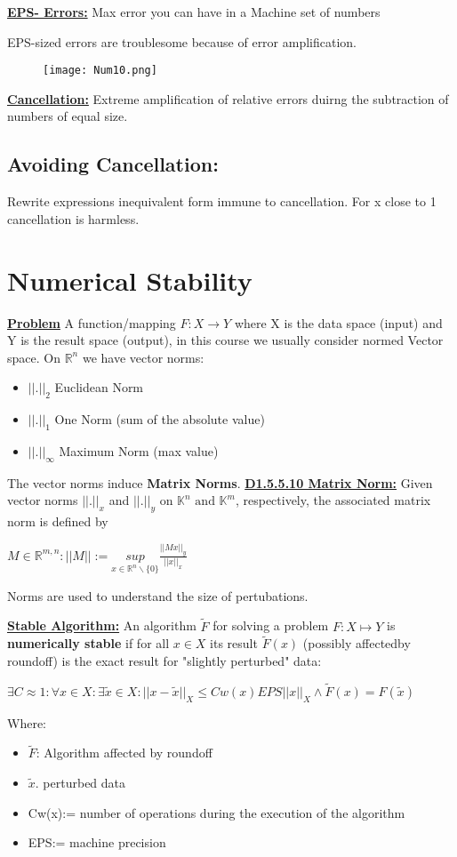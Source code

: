 \documentclass[8pt]{extreport}
\begin{document}
\underline{\textbf{EPS- Errors:}} Max error you  can have in a Machine set of numbers

EPS-sized errors are troublesome because of error amplification.
\begin{figure}[H]
\centering
\texttt{[image: Num10.png]}
\end{figure}

\underline{\textbf{Cancellation:}} Extreme amplification of relative errors duirng the subtraction of numbers of equal size. 

\subsection{Avoiding Cancellation:} Rewrite expressions inequivalent form immune to cancellation.
For x close to 1 cancellation is harmless.
  
\section{Numerical Stability}

\underline{\textbf{Problem}} A function/mapping $F:X \rightarrow Y$ where X is the data space (input) and Y is the result space (output), in this course we usually consider normed Vector space. On $\mathbb{R}^n$ we have vector norms:
\begin{itemize}
\item $||.||_2$ Euclidean Norm
\item $||.||_1$ One Norm (sum of the absolute value)
\item $||.||_\infty$ Maximum Norm (max value)
\end{itemize}
The vector norms induce \textbf{Matrix Norms}.
\underline{\textbf{D1.5.5.10 Matrix Norm:}} Given vector norms $||.||_x$ and $||.||_y$ on $\mathbb{K}^n \text{ and } \mathbb{K}^m$, respectively, the associated matrix norm is defined by 
\begin{center}
$M \in \mathbb{R}^{m,n}: ||M||:= \underset{x \in \mathbb{R}^n\backslash\{0\}}{sup} \frac{||Mx||_y}{||x||_x}$
\end{center}

Norms are used to understand the size of pertubations.

\underline{\textbf{Stable Algorithm:}} An algorithm $\tilde{F}$ for solving a problem $F:X \mapsto Y$ is \textbf{numerically stable} if for all $x \in X$ its result $\tilde{F}(x)$ (possibly affectedby roundoff) is the exact result for "slightly perturbed" data:
\begin{center}
$\exists C \approx 1: \forall x \in X: \exists \tilde{x} \in X: ||x-\tilde{x}||_X \leq Cw(x)EPS||x||_X \wedge \tilde{F}(x) = F(\tilde{x})$
\end{center}
Where:
\begin{itemize}
\item $\tilde{F}$: Algorithm affected by roundoff
\item $\tilde{x}$. perturbed data
\item Cw(x):= number of operations during the execution of the algorithm
\item EPS:= machine precision
\end{itemize}
\end{document}
